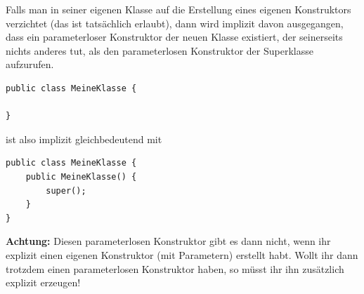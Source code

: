 Falls man in seiner eigenen Klasse auf die Erstellung eines eigenen Konstruktors 
verzichtet (das ist tatsächlich erlaubt), dann wird implizit davon ausgegangen, 
dass ein parameterloser Konstruktor der neuen Klasse existiert, der seinerseits 
nichts anderes tut, als den parameterlosen Konstruktor der Superklasse aufzurufen.

\begin{lstlisting}
public class MeineKlasse {

}
\end{lstlisting}

ist also implizit gleichbedeutend mit

\begin{lstlisting}
public class MeineKlasse {
    public MeineKlasse() {
        super();
    }
}
\end{lstlisting}

\textbf{Achtung:} Diesen parameterlosen Konstruktor gibt es dann nicht, wenn ihr 
explizit einen eigenen Konstruktor (mit Parametern) erstellt habt. Wollt ihr dann 
trotzdem einen parameterlosen Konstruktor haben, so müsst ihr ihn zusätzlich 
explizit erzeugen!
